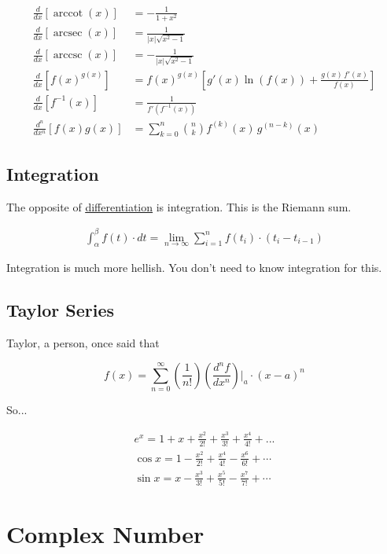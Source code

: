 \documentclass[
]{article}
\let\oldhyperref\hyperref
\renewcommand{\hyperref}[2][]{\oldhyperref[#1]{\underline{#2}}}
\providecommand{\infin}{\infty}
\begin{document}
\begin{align*}
	\frac{d}{dx}[\operatorname{arccot}(x)]     & = -\frac{1}{1 + x^2}                                                 \\
	\frac{d}{dx}[\operatorname{arcsec}(x)]     & = \frac{1}{|x|\sqrt{x^2 - 1}}                                        \\
	\frac{d}{dx}[\operatorname{arccsc}(x)]     & = -\frac{1}{|x|\sqrt{x^2 - 1}}                                       \\
	\frac{d}{dx}[f(x)^{g(x)}]                  & = f(x)^{g(x)} \left[g'(x)\ln(f(x)) + \frac{g(x)\,f'(x)}{f(x)}\right] \\
	\frac{d}{dx}[f^{-1}(x)]                    & = \frac{1}{f'(f^{-1}(x))}                                            \\
	\frac{d^n}{dx^n}[f(x)g(x)]                 & = \sum_{k=0}^{n} \binom{n}{k} f^{(k)}(x)\,g^{(n-k)}(x)
\end{align*}

\subsection{Integration}\label{integration}
The opposite of \hyperref[differentiation]{differentiation} is integration. This is the Riemann sum.

\begin{gather*}
	\int_\alpha^\beta f(t)\cdot dt=\lim_{n\to\infin}\sum_{i=1}^n f(t_i)\cdot (t_i-t_{i-1})
\end{gather*}

Integration is much more hellish. You don't need to know integration for
this.

\subsection{Taylor Series}\label{taylor-series}
Taylor, a person, once said that

\[
	f(x) = \sum_{n=0}^{\infin}{\left(\frac{1}{n!}\right)\left(\frac{d^n f}{dx^n}\right)}|_a · (x - a)^n
\]

So...

\begin{gather*}
	e^x=1+x+\frac{x^2}{2!}+\frac{x^3}{3!}+\frac{x^4}{4!}+...\\
	\cos x=1-\frac{x^2}{2!}+\frac{x^4}{4!}-\frac{x^6}{6!}+\cdots\\
	\sin x=x-\frac{x^3}{3!}+\frac{x^5}{5!}-\frac{x^7}{7!}+\cdots
\end{gather*}
\section{Complex Number}\label{complex-numbers}
\end{document}
